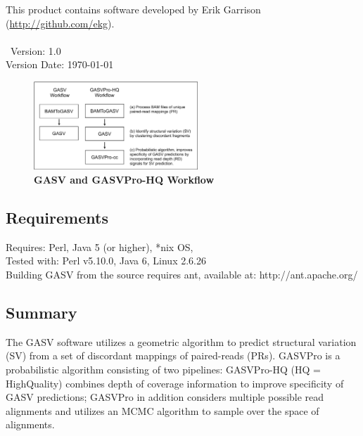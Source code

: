 \documentclass[11pt]{article}
\begin{document}
\noindent This product contains software developed by Erik Garrison (\url{http://github.com/ekg}).\\ \\ 
\
\noindent Version: 1.0\\
\noindent Version Date: \today

\begin{figure}
  \begin{center}
    \includegraphics[width=0.55\textwidth]{Figures/GASV_Workflow.pdf}
  \end{center}
  \caption{\textbf{GASV and GASVPro-HQ Workflow}}
  \label{fig:GASVWorkflow}
\end{figure}

\subsection{Requirements}
Requires: Perl, Java 5 (or higher), *nix OS, \\
\noindent Tested with: Perl v5.10.0, Java 6, Linux 2.6.26 \\

\noindent Building GASV from the source requires ant, available at: 
http://ant.apache.org/ 




\subsection{Summary}

The GASV software utilizes a geometric algorithm to predict structural variation (SV) from a set of discordant mappings of paired-reads (PRs).  GASVPro is a probabilistic algorithm consisting of two pipelines: GASVPro-HQ (HQ = HighQuality) combines depth of coverage information to improve specificity of GASV predictions; GASVPro in addition considers multiple possible read alignments and utilizes an MCMC algorithm to sample over the space of alignments.
\end{document}
